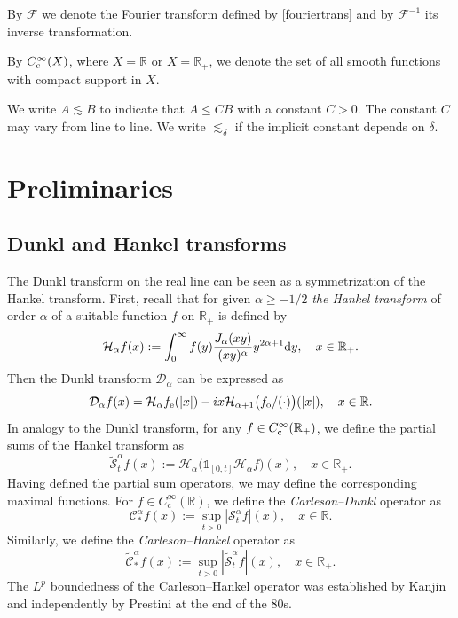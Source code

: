 \documentclass[11pt,oneside]{amsart}
\numberwithin{equation}{section}
\theoremstyle{definition}
\newcommand{\RR}{\mathbb{R}}
\newcommand{\calC}{\mathcal{C}}
\newcommand{\calF}{\mathcal{F}}
\newcommand{\calH}{\mathcal{H}}
\newcommand{\calS}{\mathcal{S}}
\newcommand{\calD}{\mathcal{D}}
\begin{document}
By $\calF$ we denote the Fourier transform defined by \eqref{fouriertrans} and by $\calF^{-1}$ its inverse transformation.

By \( C_{\rm c}^\infty(X) \), where \( X = \mathbb{R} \) or \( X = \mathbb{R}_+ \), we denote the set of all smooth functions with compact support in \( X \).


We write $A \lesssim B$ to indicate that $A\le CB$ with a constant $C>0$. The constant $C$ may vary from line to line. We write $\lesssim_{\delta}$ if the implicit constant depends on $\delta$. 
\section{Preliminaries}
\subsection{Dunkl and Hankel transforms}
The Dunkl transform on the real line can be seen as a symmetrization of the Hankel transform. First, recall that for given $\alpha\geq-1/2$ \textit{the Hankel transform} of order $\alpha$ of a suitable function $f$ on $\RR_+$ is defined by
\begin{equation*}
	\calH_\alpha f(x):=\int_0^\infty{f(y)\frac{J_\alpha(xy)}{(xy)^\alpha}y^{2\alpha+1}{\rm d}y}, \quad x\in\RR_+.
\end{equation*}
Then the Dunkl transform $\calD_\alpha$ can be expressed as
 \begin{equation}\label{DunkHankel}
     \calD_\alpha f(x)=\calH_\alpha f_{\rm e}(|x|)-ix\calH_{\alpha+1}\big(f_{\rm o}/(\cdot)\big)(|x|),\quad x\in\RR.
 \end{equation}
In analogy to the Dunkl transform, for any $f\in C_{\rm c}^\infty(\RR_+)$, we define the partial sums of the Hankel transform as
\begin{equation*}
    \widetilde{\calS}_{t}^\alpha f(x):={\calH}_{\alpha}\big(\mathds{1}_{[0,t]} {\calH}_\alpha f\big)(x),\quad x\in\RR_+.
\end{equation*}
Having defined the partial sum operators, we may define the corresponding maximal functions. For $f\in C_{\mathrm{c}}^\infty(\mathbb{R})$, we define the \textit{Carleson--Dunkl} operator as
 \begin{equation}
     \calC_{\ast}^\alpha f(x):=\sup_{t>0} |\calS_{t}^\alpha f|(x),\quad x\in\RR.
 \end{equation}
Similarly, we define the \textit{Carleson--Hankel} operator as
\begin{equation}
    \widetilde{\calC}_{\ast}^\alpha f(x):=\sup_{t>0} |\widetilde{\calS}_{t}^\alpha f|(x),\quad x\in\RR_+.
\end{equation}
The $L^p$ boundedness of the Carleson--Hankel operator was established by Kanjin \cite{Kanjin88} and independently by Prestini \cite{Prestini88} at the end of the 80s.
\end{document}
